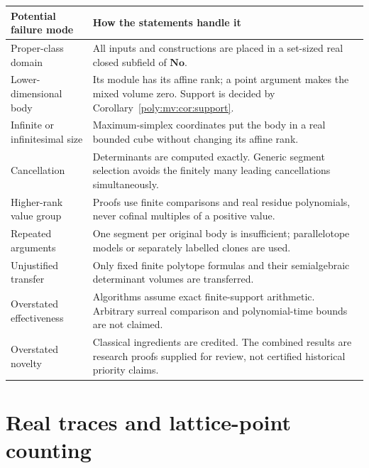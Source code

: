 \documentclass[11pt,a4paper]{article}
\numberwithin{equation}{section}
\theoremstyle{plain}
\newcommand{\No}{\mathbf{No}}
\begin{document}
\begin{center}
\begin{tabular}{@{}p{}p{}@{}}
\toprule
Potential failure mode & How the statements handle it\\
\midrule
Proper-class domain & All inputs and constructions are placed in a
set-sized real closed subfield of $\No$.\\[0.45em]
Lower-dimensional body & Its module has its affine rank; a point argument
makes the mixed volume zero. Support is decided by
Corollary~\ref{poly:mv:cor:support}.\\[0.45em]
Infinite or infinitesimal size & Maximum-simplex coordinates put the body
in a real bounded cube without changing its affine rank.\\[0.45em]
Cancellation & Determinants are computed exactly. Generic segment
selection avoids the finitely many leading cancellations simultaneously.\\[0.45em]
Higher-rank value group & Proofs use finite comparisons and real residue
polynomials, never cofinal multiples of a positive value.\\[0.45em]
Repeated arguments & One segment per original body is insufficient;
parallelotope models or separately labelled clones are used.\\[0.45em]
Unjustified transfer & Only fixed finite polytope formulas and their
semialgebraic determinant volumes are transferred.\\[0.45em]
Overstated effectiveness & Algorithms assume exact finite-support
arithmetic. Arbitrary surreal comparison and polynomial-time bounds are
not claimed.\\[0.45em]
Overstated novelty & Classical ingredients are credited. The combined
results are research proofs supplied for review, not certified historical
priority claims.\\
\bottomrule
\end{tabular}
\end{center}


\part{Real traces and lattice-point counting}\label{poly:part:ehr}
\end{document}
